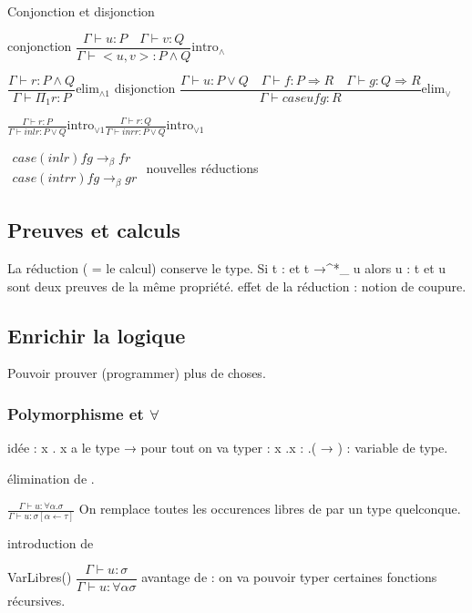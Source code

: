 \documentclass[10pt,a4paper]{article}
\begin{document}
Conjonction et disjonction

conjonction 
$\dfrac{\Gamma \vdash u:P  \quad \Gamma \vdash v:Q }{\Gamma \vdash <u,v> : P \wedge Q}\text{intro}_{\wedge}$

$\dfrac{\Gamma \vdash r : P \wedge Q}{\Gamma \vdash \Pi_1 r :P }\text{elim}_{\wedge 1}$
disjonction
$\dfrac{\Gamma \vdash u : P \vee Q \quad \Gamma \vdash f: P \Rightarrow R \quad \Gamma \vdash g : Q \Rightarrow R}{\Gamma \vdash case u f g : R}\text{elim}_{\vee}$

$\frac{\Gamma \vdash r: P}{\Gamma \vdash inl r : P \vee Q}\text{intro}_{\vee 1}
\frac{\Gamma \vdash r: Q}{\Gamma \vdash inr r : P \vee Q}\text{intro}_{\vee 1}$

$\begin{array}{l}
case (inl r) f g →_{\beta} f r\\
case (intr r) f g  →_{\beta} g r
\end{array}$ nouvelles \beta réductions


\subsection{Preuves et calculs}
La \beta réduction ( = le calcul) conserve le type.
Si t : \tau et t →^*_{\beta} u alors u : \tau
t et u sont deux preuves de la même propriété.
effet de la réduction : notion de coupure.

\subsection{Enrichir la logique}

Pouvoir prouver (programmer) plus de choses.

\subsubsection{Polymorphisme et $\forall$}

idée : \lambda x . x a le type \alpha → \alpha pour tout \alpha
on va typer  : \lambda x .x : \forall \alpha.( \alpha → \alpha) 
\alpha : variable de type.

élimination de \forall.

$\frac{\Gamma \vdash u :\forall \alpha . \sigma}{\Gamma \vdash u :\sigma[ \alpha ← \tau]}$
On remplace toutes les occurences libres de \alpha par un type \tau quelconque.

introduction de \forall

\alpha \not \in VarLibres(\Gamma)
$\dfrac{\Gamma \vdash u : \sigma}{\Gamma \vdash u : \forall \alpha \sigma}$
avantage de \forall : on va pouvoir typer certaines fonctions récursives.
\end{document}
